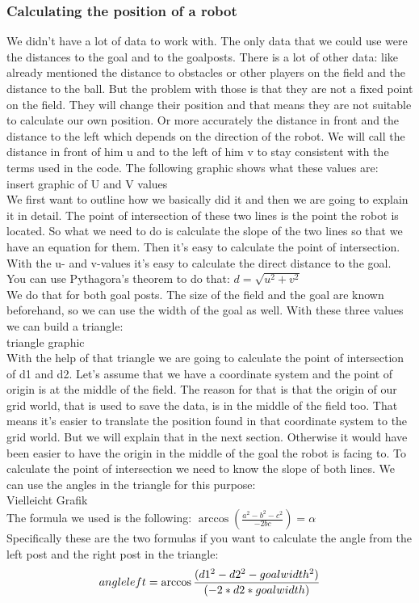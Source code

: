 \documentclass[lnicst,a4paper]{svmultln}
\begin{document}
\subsubsection{Calculating the position of a robot}
We didn't have a lot of data to work with. The only data that we could use were the distances to the goal and to the goalposts. There is a lot of other data: like already mentioned the distance to obstacles or other players on the field and the distance to the ball. But the problem with those is that they are not a fixed point on the field. They will change their position and that means they are not suitable to calculate our own position. Or more accurately the distance in front and the distance to the left which depends on the direction of the robot. We will call the distance in front of him u and to the left of him v to stay consistent with the terms used in the code. The following graphic shows what these values are:\\
insert graphic of U and V values\\
We first want to outline how we basically did it and then we are going to explain it in detail. The point of intersection of these two lines is the point the robot is located. So what we need to do is calculate the slope of the two lines so that we have an equation for them. Then it's easy to calculate the point of intersection.\\
With the u- and v-values it's easy to calculate the direct distance to the goal. You can use Pythagora's theorem to do that: \(d = \sqrt{u^2+v^2}\)\\
We do that for both goal posts. The size of the field and the goal are known beforehand, so we can use the width of the goal as well. With these three values we can build a triangle:\\
triangle graphic\\
With the help of that triangle we are going to calculate the point of intersection of d1 and d2. Let's assume that we have a coordinate system and the point of origin is at the middle of the field. The reason for that is that the origin of our grid world, that is used to save the data, is in the middle of the field too. That means it's easier to translate the position found in that coordinate system to the grid world. But we will explain that in the next section. Otherwise it would have been easier to have the origin in the middle of the goal the robot is facing to. To calculate the point of intersection we need to know the slope of both lines. We can use the angles in the triangle for this purpose:\\
Vielleicht Grafik\\
The formula we used is the following: \(\arccos{(\frac{a^2-b^2-c^2}{-2bc})} = \alpha\)\\ Specifically these are the two formulas if you want to calculate the angle from the left post and the right post in the triangle:\\
\begin{equation}
	angleleft = \arccos{\frac{(d1^2 - d2^2 - goalwidth^2)}{(-2*d2*goalwidth)}}\\	
\end{equation}
\end{document}
